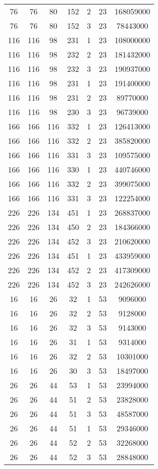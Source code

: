 \documentclass[a4paper,11pt]{article}
\begin{document}
\begin{longtable}{ |c|c|c|c|c|c|c| }
76 & 76 & 80 & 152 & 2 & 23 & 168059000 \\
76 & 76 & 80 & 152 & 3 & 23 & 78443000 \\
116 & 116 & 98 & 231 & 1 & 23 & 108000000 \\
116 & 116 & 98 & 232 & 2 & 23 & 181432000 \\
116 & 116 & 98 & 232 & 3 & 23 & 190937000 \\
116 & 116 & 98 & 231 & 1 & 23 & 191400000 \\
116 & 116 & 98 & 231 & 2 & 23 & 89770000 \\
116 & 116 & 98 & 230 & 3 & 23 & 96739000 \\
166 & 166 & 116 & 332 & 1 & 23 & 126413000 \\
166 & 166 & 116 & 332 & 2 & 23 & 385820000 \\
166 & 166 & 116 & 331 & 3 & 23 & 109575000 \\
166 & 166 & 116 & 330 & 1 & 23 & 440746000 \\
166 & 166 & 116 & 332 & 2 & 23 & 399075000 \\
166 & 166 & 116 & 331 & 3 & 23 & 122254000 \\
226 & 226 & 134 & 451 & 1 & 23 & 268837000 \\
226 & 226 & 134 & 450 & 2 & 23 & 184366000 \\
226 & 226 & 134 & 452 & 3 & 23 & 210620000 \\
226 & 226 & 134 & 451 & 1 & 23 & 433959000 \\
226 & 226 & 134 & 452 & 2 & 23 & 417309000 \\
226 & 226 & 134 & 452 & 3 & 23 & 242626000 \\
16 & 16 & 26 & 32 & 1 & 53 & 9096000 \\
16 & 16 & 26 & 32 & 2 & 53 & 9128000 \\
16 & 16 & 26 & 32 & 3 & 53 & 9143000 \\
16 & 16 & 26 & 31 & 1 & 53 & 9314000 \\
16 & 16 & 26 & 32 & 2 & 53 & 10301000 \\
16 & 16 & 26 & 30 & 3 & 53 & 18497000 \\
26 & 26 & 44 & 53 & 1 & 53 & 23994000 \\
26 & 26 & 44 & 51 & 2 & 53 & 23828000 \\
26 & 26 & 44 & 51 & 3 & 53 & 48587000 \\
26 & 26 & 44 & 51 & 1 & 53 & 29346000 \\
26 & 26 & 44 & 52 & 2 & 53 & 32268000 \\
26 & 26 & 44 & 52 & 3 & 53 & 28848000 \\

\end{longtable}
\end{document}
